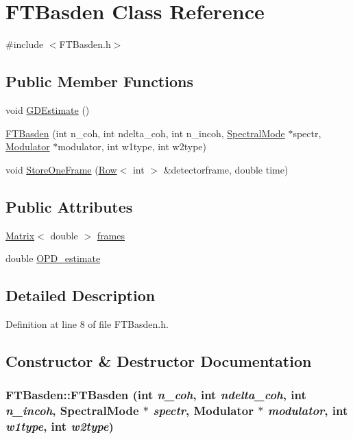 \hypertarget{classFTBasden}{
\section{FTBasden Class Reference}
\label{classFTBasden}
}


{\ttfamily \#include $<$FTBasden.h$>$}

\subsection*{Public Member Functions}
\begin{DoxyCompactItemize}
\item 
void \hyperlink{classFTBasden_acd78f51a4e9289f0baa700911a8d57e8}{GDEstimate} ()
\item 
\hyperlink{classFTBasden_a5f5d73040e778dbf7115ab23f6bb9c9d}{FTBasden} (int n\_\-coh, int ndelta\_\-coh, int n\_\-incoh, \hyperlink{classSpectralMode}{SpectralMode} $\ast$spectr, \hyperlink{classModulator}{Modulator} $\ast$modulator, int w1type, int w2type)
\item 
void \hyperlink{classFTBasden_a76fe6fade8b81a074ea5e1724dbe4d6c}{StoreOneFrame} (\hyperlink{classRow}{Row}$<$ int $>$ \&detectorframe, double time)
\end{DoxyCompactItemize}
\subsection*{Public Attributes}
\begin{DoxyCompactItemize}
\item 
\hyperlink{classMatrix}{Matrix}$<$ double $>$ \hyperlink{classFTBasden_a4dcdeaee548ee6378d126b348c943f39}{frames}
\item 
double \hyperlink{classFTBasden_a306a1bc5d8932b9eb3ba98d670ea631b}{OPD\_\-estimate}
\end{DoxyCompactItemize}


\subsection{Detailed Description}


Definition at line 8 of file FTBasden.h.



\subsection{Constructor \& Destructor Documentation}
\hypertarget{classFTBasden_a5f5d73040e778dbf7115ab23f6bb9c9d}{
\subsubsection[{FTBasden}]{\setlength{\rightskip}{0pt plus 5cm}FTBasden::FTBasden (int {\em n\_\-coh}, \/  int {\em ndelta\_\-coh}, \/  int {\em n\_\-incoh}, \/  {\bf SpectralMode} $\ast$ {\em spectr}, \/  {\bf Modulator} $\ast$ {\em modulator}, \/  int {\em w1type}, \/  int {\em w2type})}}
\label{classFTBasden_a5f5d73040e778dbf7115ab23f6bb9c9d}


